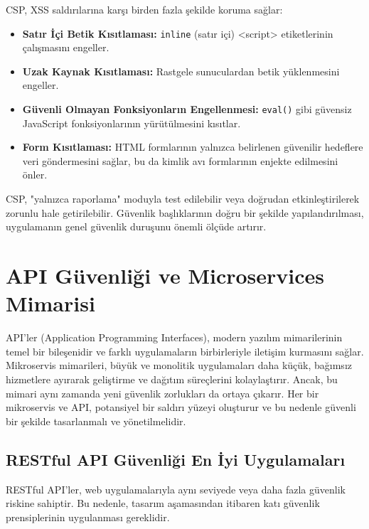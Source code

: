 CSP, XSS saldırılarına karşı birden fazla şekilde koruma sağlar:

\begin{itemize}
\item \textbf{Satır İçi Betik Kısıtlaması:} \texttt{inline} (satır içi) \textless script\textgreater{} etiketlerinin çalışmasını engeller.
\item \textbf{Uzak Kaynak Kısıtlaması:} Rastgele sunuculardan betik yüklenmesini engeller.
\item \textbf{Güvenli Olmayan Fonksiyonların Engellenmesi:} \texttt{eval()} gibi güvensiz JavaScript fonksiyonlarının yürütülmesini kısıtlar.
\item \textbf{Form Kısıtlaması:} HTML formlarının yalnızca belirlenen güvenilir hedeflere veri göndermesini sağlar, bu da kimlik avı formlarının enjekte edilmesini önler.
\end{itemize}

CSP, "yalnızca raporlama" moduyla test edilebilir veya doğrudan etkinleştirilerek zorunlu hale getirilebilir. Güvenlik başlıklarının doğru bir şekilde yapılandırılması, uygulamanın genel güvenlik duruşunu önemli ölçüde artırır.

\section{API Güvenliği ve Microservices Mimarisi}

API'ler (Application Programming Interfaces), modern yazılım mimarilerinin temel bir bileşenidir ve farklı uygulamaların birbirleriyle iletişim kurmasını sağlar. Mikroservis mimarileri, büyük ve monolitik uygulamaları daha küçük, bağımsız hizmetlere ayırarak geliştirme ve dağıtım süreçlerini kolaylaştırır. Ancak, bu mimari aynı zamanda yeni güvenlik zorlukları da ortaya çıkarır. Her bir mikroservis ve API, potansiyel bir saldırı yüzeyi oluşturur ve bu nedenle güvenli bir şekilde tasarlanmalı ve yönetilmelidir.

\subsection{RESTful API Güvenliği En İyi Uygulamaları}

RESTful API'ler, web uygulamalarıyla aynı seviyede veya daha fazla güvenlik riskine sahiptir. Bu nedenle, tasarım aşamasından itibaren katı güvenlik prensiplerinin uygulanması gereklidir.

